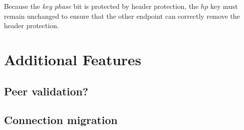 Because the \textit{key phase} bit is protected by header protection, the $hp$ key must remain
unchanged to ensure that the other endpoint can correctly remove the header protection.

\section{Additional Features}

\subsection{Peer validation?}

\subsection{Connection migration}
